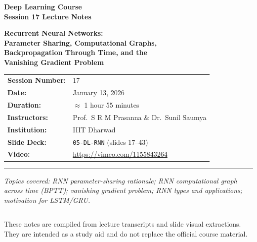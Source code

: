 \documentclass[12pt,a4paper]{article}
\begin{document}
\begin{titlepage}
  \centering
  \vspace*{2cm}
  {\LARGE\bfseries Deep Learning Course\\[0.4em]
   Session 17 Lecture Notes\par}
  \vspace{1.5cm}
  {\large\bfseries Recurrent Neural Networks:\\
  Parameter Sharing, Computational Graphs,\\
  Backpropagation Through Time, and the\\
  Vanishing Gradient Problem\par}
  \vspace{1.5cm}
  \begin{tabular}{ll}
    \textbf{Session Number:} & 17 \\[0.3em]
    \textbf{Date:}           & January 13, 2026 \\[0.3em]
    \textbf{Duration:}       & $\approx$ 1 hour 55 minutes \\[0.3em]
    \textbf{Instructors:}    & Prof.\ S R M Prasanna \& Dr.\ Sunil Saumya \\[0.3em]
    \textbf{Institution:}    & IIIT Dharwad \\[0.3em]
    \textbf{Slide Deck:}     & \texttt{05-DL-RNN} (slides 17--43) \\[0.3em]
    \textbf{Video:}          & \url{https://vimeo.com/1155843264} \\
  \end{tabular}
  \vspace{2cm}
  \hrule
  \vspace{0.5cm}
  {\itshape Topics covered: RNN parameter-sharing rationale; RNN computational
  graph across time (BPTT); vanishing gradient problem; RNN types and
  applications; motivation for LSTM/GRU.\par}
  \vspace{0.5cm}
  \hrule
  \vfill
  {\small These notes are compiled from lecture transcripts and slide visual
  extractions.  They are intended as a study aid and do not replace the
  official course material.}
\end{titlepage}


\newpage
\end{document}
